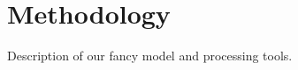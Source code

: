 \section{Methodology}
\begin{sloppypar}
	Description of our fancy model and processing tools.
\end{sloppypar}

